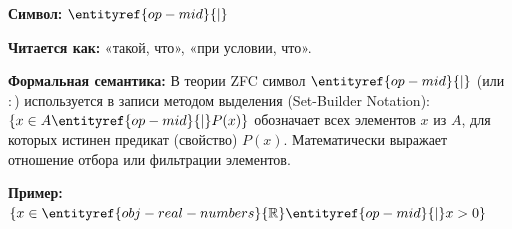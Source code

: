 
\hypertarget{term-mid}{}
\hypertarget{term-mid}{}
\begin{object} %

\textbf{Символ:} $\entityref{op-mid}{\mid}$

\textbf{Читается как:} «такой, что», «при условии, что».

\textbf{Формальная семантика:}
В теории  ZFC символ $\entityref{op-mid}{\mid}$ (или $\colon$) используется в записи  методом выделения (Set-Builder Notation): $\{x \in A \entityref{op-mid}{\mid} P(x)\}$ обозначает  всех элементов $x$ из $A$, для которых истинен предикат (свойство) $P(x)$.
Математически выражает отношение отбора или фильтрации элементов.

\textbf{Пример:} $\{x \in \entityref{obj-real-numbers}{\mathbb{R}} \entityref{op-mid}{\mid} x > 0\}$
\end{object}
